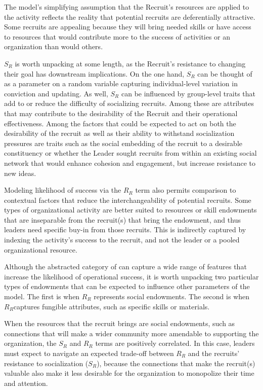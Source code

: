 The model's simplifying assumption that the Recruit's resources are applied to the activity reflects the reality that potential recruits are deferentially attractive. Some recruits are appealing because they will bring needed skills or have access to resources that would contribute more to the success of activities or an organization than would others. 

$S_{R}$ is worth unpacking at some length, as the Recruit's resistance to changing their goal has downstream implications. On the one hand, $S_{R}$ can be thought of as a parameter on a random variable capturing individual-level variation in conviction and updating. As well, $S_{R}$ can be influenced by group-level traits that add to or reduce the difficulty of socializing recruits. Among these are attributes that may contribute to the desirability of the Recruit and their operational effectiveness. Among the factors that could be expected to act on both the desirability of the recruit as well as their ability to withstand socialization pressures are traits such as the social embedding of the recruit to a desirable constituency or whether the Leader sought recruits from within an existing social network that would enhance cohesion and engagement, but increase resistance to new ideas.

Modeling likelihood of success via the $R_{R}$ term also permits comparison to contextual factors that reduce the interchangeability of potential recruits. Some types of organizational activity are better suited to resources or skill endowments that are inseparable from the recruit(s) that bring the endowment, and thus leaders need specific buy-in from those recruits. This is indirectly captured by indexing the activity's success to the recruit, and not the leader or a pooled organizational resource. 

Although the abstracted category of  can capture a wide range of features that increase the likelihood of operational success, it is worth unpacking two particular types of endowments that can be expected to influence other parameters of the model. The first is when $R_{R}$ represents social endowments. The second is when $R_{R} $captures fungible attributes, such as specific skills or materials.

 When the resources that the recruit brings are social endowments, such as connections that will make a wider community more amendable to supporting the organization, the $S_{R}$ and $R_{R}$ terms are positively correlated.
In this case, leaders must expect to navigate an expected trade-off between $R_{R}$ and the recruits' resistance to socialization ($S_{R}$), because the connections that make the recruit(s) valuable also make it less desirable for the organization to monopolize their time and attention.

